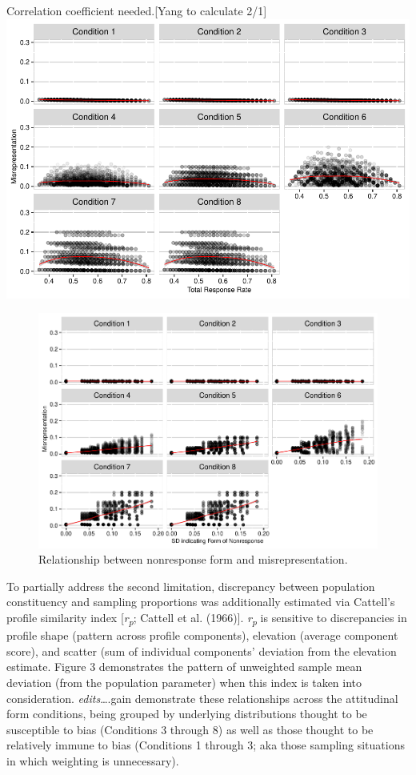\documentclass[
  man,floatsintext]{apa7}
\begin{document}
Correlation coefficient needed.{[}Yang to calculate 2/1{]}
\includegraphics{Simulation-paper2-20200207_files/figure-latex/Figure1-1.pdf}

\begin{figure}
\centering
\includegraphics{Simulation-paper2-20200207_files/figure-latex/Figure2-1.pdf}
\caption{\label{fig:Figure2}Relationship between nonresponse form and misrepresentation.}
\end{figure}

To partially address the second limitation, discrepancy between population constituency and sampling proportions was additionally estimated via Cattell's profile similarity index {[}\emph{r\textsubscript{p}}; Cattell et al. (1966){]}. \emph{r\textsubscript{p}} is sensitive to discrepancies in profile shape (pattern across profile components), elevation (average component score), and scatter (sum of individual components' deviation from the elevation estimate. Figure 3 demonstrates the pattern of unweighted sample mean deviation (from the population parameter) when this index is taken into consideration. \emph{edits}\ldots.gain demonstrate these relationships across the attitudinal form conditions, being grouped by underlying distributions thought to be susceptible to bias (Conditions 3 through 8) as well as those thought to be relatively immune to bias (Conditions 1 through 3; aka those sampling situations in which weighting is unnecessary).
\end{document}

